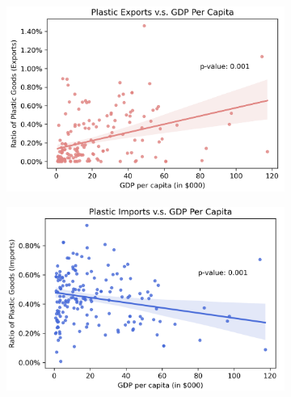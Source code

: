 \documentclass[dvipsnames]{article}
\begin{document}
\begin{figure}[htb!]
	\centering
	\begin{subfigure}{0.45\textwidth}
		\centering
		\includegraphics[width=\textwidth]{figures/export.png}	
		\label{subfig:export}
	\end{subfigure}
	\begin{subfigure}{0.45\textwidth}
		\centering 
		\includegraphics[width=\textwidth]{figures/import.png}
		\label{subfig:import}
	\end{subfigure}
	\begin{subfigure}{0.3\textwidth}
		\centering 

\end{subfigure}
\end{figure}
\end{document}
